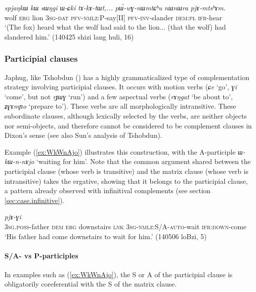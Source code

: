 \documentclass[oneside,a4paper,11pt]{article}
\newcommand{\ipa}[1]{\textit{\phon#1}}
\newcommand{\jpg}[2]{\ipa{#1} `#2'}
\begin{document}
\begin{exe}
\ex \label{ex:pWwGnWmtChu}
\gll 
\ipa{spjaŋkɯ} 	\ipa{kɯ} 	\ipa{sɯŋgi} 	\ipa{ɯ-ɕki} 	\ipa{tɤ-kɤ-tɯt,...} 	\ipa{pɯ́-wɣ-nɯmtɕʰu} 	\ipa{nɯnɯra} 	\ipa{pjɤ-mtsʰɤm.} \\
wolf \textsc{erg} lion \textsc{3sg-dat} \textsc{pfv-nmlz:P}-say[II] \textsc{pfv-inv}-slander \textsc{dem:pl} \textsc{ifr}-hear \\
\glt `(The fox) heard what the wolf had said to the lion... (that the wolf) had slandered him.' (140425 shizi lang huli, 16)
\end{exe}

 \subsubsection{Participial clauses} \label{sec:SApart}
Japhug, like Tshobdun (\citealt{sun12complementation}) has a highly grammaticalized type of complementation strategy involving participial clauses. It occurs with motion verbs (\jpg{ɕe}{go}, \jpg{ɣi}{come}, but not \jpg{rɟɯɣ}{run}) and a few aspectual verbs  (\jpg{rɤŋgat}{be about to}, \jpg{ʑɣɤmɲo}{prepare to}). These verbs are all morphologically intransitive. These subordinate clauses, although lexically selected by the verbs, are neither objects nor semi-objects, and therefore cannot be considered to be complement clauses in Dixon's sense (see also Sun's \citeyear{sun12complementation} analysis of Tshobdun).

Example (\ref{ex:WkWnAjo}) illustrates this construction, with the A-participle \ipa{ɯ-kɯ-n-nɤjo} `waiting for him'. Note that the common argument shared between the participial clause (whose verb is transitive) and the matrix clause (whose verb is intransitive) takes the ergative, showing that it belongs to the participial clause, a pattern already observed with infinitival complements (see section \ref{sec:case.infinitive}).

\begin{exe}
\ex \label{ex:WkWnAjo}
\gll [\ipa{ɯ-wa} 	\ipa{nɯ} 	\ipa{kɯ} 	\ipa{kʰɤpa} 	\ipa{tɕe} 	\ipa{ɯ-kɯ-n-nɤjo}] 	\ipa{pjɤ-ɣi} \\
\textsc{3sg.poss}-father \textsc{dem} \textsc{erg} downstairs \textsc{lnk} \textsc{3sg-nmlz:S/A-auto}-wait \textsc{ifr:down}-come \\
\glt `His father had come downstairs to wait for him.' (140506 loBzi, 5)
\end{exe}
  

\paragraph{S/A- vs P-participles} \label{sec:SAparticiple.coref}
In examples such as (\ref{ex:WkWnAjo}), the S or A of the participial clause is obligatorily coreferential with the S of the matrix clause.
\end{document}
